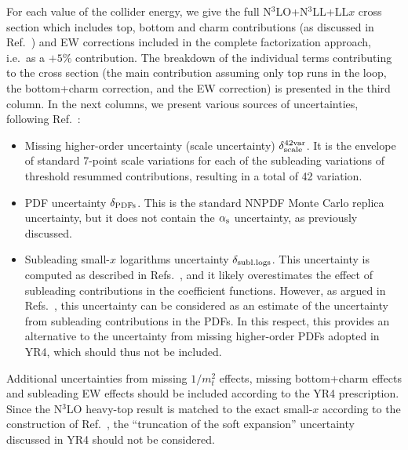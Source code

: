 For each value of the collider energy, we give the full
N$^3$LO+N$^3$LL+LL$x$ cross section which includes top, bottom and
charm contributions (as discussed in Ref.~\cite{Bonvini:2018iwt}) and
EW corrections included in the complete factorization approach, i.e.\
as a $+5\%$ contribution.  The breakdown of the individual terms
contributing to the cross section (the main contribution assuming only
top runs in the loop, the bottom+charm correction, and the EW
correction) is presented in the third column.  In the next columns, we
present various sources of uncertainties,
following Ref.~\cite{Bonvini:2018ixe}:
\begin{itemize}
\item Missing higher-order uncertainty (scale uncertainty)
  $\delta_{\rm scale}^{\rm 42var}$. It is the envelope of standard
  7-point scale variations for each of the subleading variations of
  threshold resummed contributions, resulting in a total of 42
  variation.

\item PDF uncertainty $\delta_{\rm PDFs}$. This is the standard NNPDF
  Monte Carlo replica uncertainty, but it does not contain the $\alpha_\text{s}$
  uncertainty, as previously discussed.

\item Subleading small-$x$ logarithms uncertainty
  $\delta_{\rm subl.logs}$. This uncertainty is computed as described
  in Refs.~\cite{Bonvini:2018ixe,Bonvini:2018iwt}, and it likely
  overestimates the effect of subleading contributions in the
  coefficient functions. However, as argued in
  Refs.~\cite{Bonvini:2018ixe,Bonvini:2018iwt}, this uncertainty can
  be considered as an estimate of the uncertainty from subleading
  contributions in the PDFs. In this respect, this provides an
  alternative to the uncertainty from missing higher-order PDFs
  adopted in YR4, which should thus not be included.
\end{itemize}
Additional uncertainties from missing $1/m_t^2$ effects, missing
bottom+charm effects and subleading EW effects should be included
according to the YR4 prescription.  Since the N$^3$LO heavy-top result
is matched to the exact small-$x$ according to the construction of
Ref.~\cite{Bonvini:2018iwt}, the ``truncation of the soft expansion''
uncertainty discussed in YR4 should not be considered.

